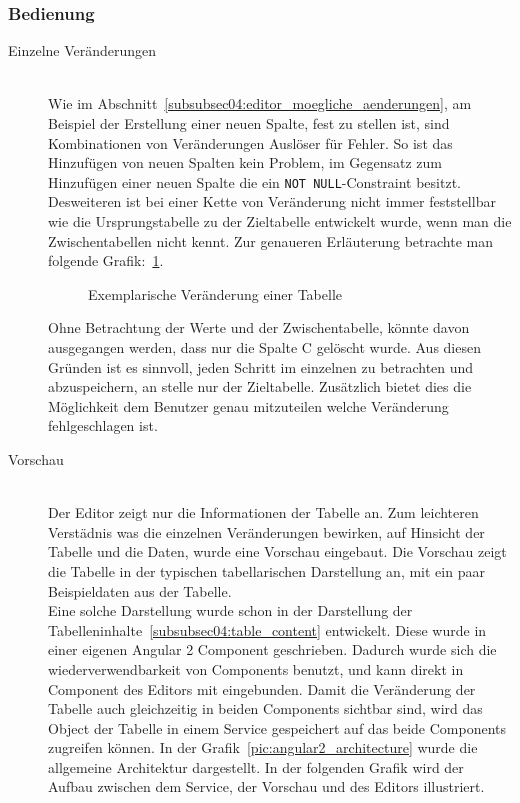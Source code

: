 \subsubsection{Bedienung}
\label{subsubsec04:editor_bedienung}

\begin{description}
\item[Einzelne Veränderungen] \hfill\\
Wie im Abschnitt~\ref{subsubsec04:editor_moegliche_aenderungen}, am Beispiel der Erstellung einer neuen Spalte, fest zu stellen ist, sind Kombinationen von Veränderungen Auslöser für Fehler. So ist das Hinzufügen von neuen Spalten kein Problem, im Gegensatz zum Hinzufügen einer neuen Spalte die ein \texttt{NOT NULL}-Constraint besitzt. \\
Desweiteren ist bei einer Kette von Veränderung nicht immer feststellbar wie die Ursprungstabelle zu der Zieltabelle entwickelt wurde, wenn man die Zwischentabellen nicht kennt.
Zur genaueren Erläuterung betrachte man folgende Grafik:~\ref{pic:table_chain_changes_example}. 

\begin{figure}[ht]
        \centering
        \caption{Exemplarische Veränderung einer Tabelle}
        \label{pic:table_chain_changes_example}
\end{figure}

Ohne Betrachtung der Werte und der Zwischentabelle, könnte davon ausgegangen werden, dass nur die Spalte C gelöscht wurde.
Aus diesen Gründen ist es sinnvoll, jeden Schritt im einzelnen zu betrachten und abzuspeichern, an stelle nur der Zieltabelle.
Zusätzlich bietet dies die Möglichkeit dem Benutzer genau mitzuteilen welche Veränderung fehlgeschlagen ist.


\item[Vorschau] \hfill\\
Der Editor zeigt nur die Informationen der Tabelle an. Zum leichteren Verstädnis was die einzelnen Veränderungen bewirken, auf Hinsicht der Tabelle und die Daten, wurde eine Vorschau eingebaut. Die Vorschau zeigt die Tabelle in der typischen tabellarischen Darstellung an, mit ein paar Beispieldaten aus der Tabelle.\\
Eine solche Darstellung wurde schon in der Darstellung der Tabelleninhalte~\ref{subsubsec04:table_content} entwickelt. Diese wurde in einer eigenen Angular 2 Component geschrieben. Dadurch wurde sich die wiederverwendbarkeit von Components benutzt, und kann direkt in Component des Editors mit eingebunden. Damit die Veränderung der Tabelle auch gleichzeitig in beiden Components sichtbar sind, wird das Object der Tabelle in einem Service gespeichert auf das beide Components zugreifen können. In der Grafik~\ref{pic:angular2_architecture} wurde die allgemeine Architektur dargestellt. In der folgenden Grafik wird der Aufbau zwischen dem Service, der Vorschau und des Editors illustriert. %


\end{description}
